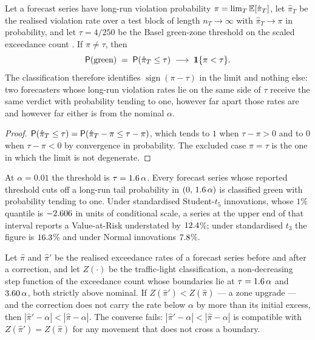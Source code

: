 \begin{proposition}
	\label{prop:traffic_limit}
	Let a forecast series have long-run violation probability
	$\pi = \lim_{T}\E[\hat\pi_T]$, let $\hat\pi_T$ be the realised violation rate
	over a test block of length $n_T\to\infty$ with $\hat\pi_T\to\pi$ in
	probability, and let $\tau = 4/250$ be the Basel green-zone threshold on the
	scaled exceedance count \citep{basel1996}. If $\pi\neq\tau$, then
	\begin{equation}
		\label{eq:traffic_limit}
		\P(\text{green})
		\;=\;
		\P\!\left(\hat\pi_T\le\tau\right)
		\;\longrightarrow\;
		\mathbf 1\{\pi<\tau\}.
	\end{equation}
	The classification therefore identifies $\operatorname{sign}(\pi-\tau)$ in the
	limit and nothing else: two forecasters whose long-run violation rates lie on
	the same side of $\tau$ receive the same verdict with probability tending to
	one, however far apart those rates are and however far either is from the
	nominal $\alpha$.
\end{proposition}

\begin{proof}
	$\P(\hat\pi_T\le\tau)=\P(\hat\pi_T-\pi\le\tau-\pi)$, which tends to $1$ when
	$\tau-\pi>0$ and to $0$ when $\tau-\pi<0$ by convergence in probability. The
	excluded case $\pi=\tau$ is the one in which the limit is not degenerate.
\end{proof}

\begin{corollary}
	\label{cor:traffic_interval}
	At $\alpha = 0.01$ the threshold is $\tau = \nTLTauOverAlpha\,\alpha$. Every forecast series
	whose reported threshold cuts off a long-run tail probability in
	$(0,\,\nTLTauOverAlpha\,\alpha)$ is classified green with probability tending to one.
	Under standardised Student-$t_5$ innovations, whose $1\%$ quantile is
	$\nGapQTrueStd$ in units of conditional scale, a series at the upper end of
	that interval reports a Value-at-Risk understated by $\nTLUndTFive$\%; under
	standardised $t_3$ the figure is $\nTLUndTThree$\% and under Normal innovations $\nTLUndNormal$\%.
\end{corollary}

\begin{proposition}
	\label{prop:zone_inclusion}
	Let $\hat\pi$ and $\hat\pi'$ be the realised exceedance rates of a forecast
	series before and after a correction, and let $Z(\cdot)$ be the traffic-light
	classification, a non-decreasing step function of the exceedance count whose
	boundaries lie at $\tau = \nTLTauOverAlpha\,\alpha$ and $\nTLTauYellowOverAlpha\,\alpha$, both strictly above
	nominal. If $Z(\hat\pi') < Z(\hat\pi)$ --- a zone upgrade --- and the
	correction does not carry the rate below $\alpha$ by more than its initial
	excess, then $|\hat\pi' - \alpha| < |\hat\pi - \alpha|$. The converse fails:
	$|\hat\pi' - \alpha| < |\hat\pi - \alpha|$ is compatible with
	$Z(\hat\pi') = Z(\hat\pi)$ for any movement that does not cross a boundary.
\end{proposition}

